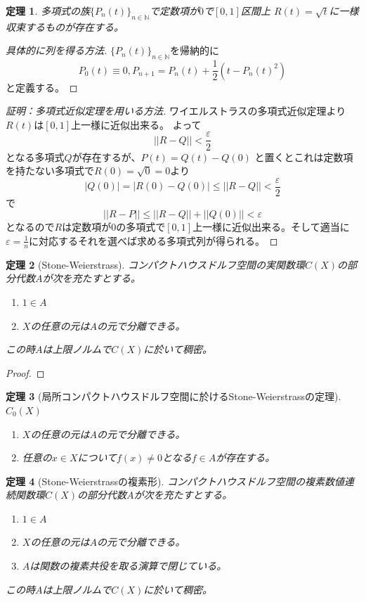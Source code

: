 \documentclass{jsarticle}
\newtheorem{thm}{定理}
\begin{document}
\begin{thm}
多項式の族$\{P_{n}(t)\}_{n\in \mathbb{N}}$で定数項が$0$で$[0,1]$区間上 $R(t)=\sqrt{t} $に一様収束するものが存在する。

\end{thm}
\begin{proof}[具体的に列を得る方法]  $\{P_{n}(t)\}_{n\in \mathbb{N}}$を帰納的に
\[
P_{0}(t)\equiv 0,  P_{n+1}=P_{n}(t)+\frac{1}{2}(t-P_{n}(t)^2)
\]
と定義する。
\end{proof}
\begin{proof}[証明：多項式近似定理を用いる方法]
ワイエルストラスの多項式近似定理より$R(t)$は$[0,1]$上一様に近似出来る。
よって
\[
||R-Q||<\frac{\varepsilon}{2}
\]となる多項式$Q$が存在するが、$P(t)=Q(t)-Q(0)$	と置くとこれは定数項を持たない多項式で$R(0)=\sqrt{0}=0$より
\[
|Q(0)|=|R(0)-Q(0)|\le||R-Q||<\frac{\varepsilon}{2}
\]で
\[
||R-P||\le ||R-Q||+||Q(0)||<\varepsilon
\]
となるので$R$は定数項が$0$の多項式で$[0,1]$上一様に近似出来る。そして適当に$\varepsilon=\frac{1}{n}$に対応するそれを選べば求める多項式列が得られる。

\end{proof}

 \begin{thm}[Stone-Weierstrass]
コンパクトハウスドルフ空間の実関数環$C(X)$の部分代数$A$が次を充たすとする。


  \begin{enumerate}
   \item $1\in A$
   \item $X$の任意の元は$A$の元で分離できる。
  \end{enumerate}


この時$A$は上限ノルムで$C(X)$に於いて稠密。
\end{thm}
\begin{proof}

\end{proof}

\begin{thm}[局所コンパクトハウスドルフ空間に於けるStone-Weierstrassの定理]$C_0(X)$
  \begin{enumerate}
   \item $X$の任意の元は$A$の元で分離できる。
   \item 任意の$x\in X$について$f(x)\neq 0$となる$f\in A$が存在する。
  \end{enumerate}
\end{thm}


 \begin{thm}[Stone-Weierstrassの複素形]
コンパクトハウスドルフ空間の複素数値連続関数環$C(X)$の部分代数$A$が次を充たすとする。

\begin{enumerate}
   \item $1\in A$
   \item $X$の任意の元は$A$の元で分離できる。
   \item $A$は関数の複素共役を取る演算で閉じている。
  \end{enumerate}

この時$A$は上限ノルムで$C(X)$に於いて稠密。
\end{thm}
\end{document}
